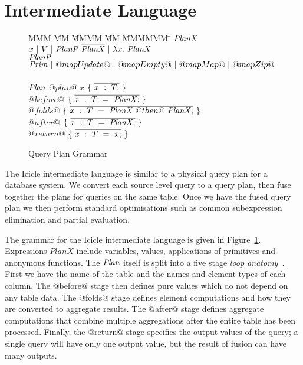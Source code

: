 \section{Intermediate Language}
\label{s:IcicleCore}

\begin{figure}

\begin{tabbing}
MMM \= MM \= MMMM \= MM \= MMMMMM \= \kill
$\mathit{PlanX}$
\GrammarDef
  $x~|~V~|~\mathit{PlanP}~\overline{\mathit{PlanX}}~|~\lambda{}x.~\mathit{PlanX}$
\\
$\mathit{PlanP}$
\GrammarDef
  $\mathit{Prim}~|~@mapUpdate@~|~@mapEmpty@~|~@mapMap@~|~@mapZip@$
\\
\\
$\mathit{Plan}$
\GrammarDef
  $@plan@~x$ \> $\{~\overline{x~:~T;}~\}$
\\
  \> \> $@before@$ \> $\{~\overline{x~:~T~=~\mathit{PlanX};}~\}$ \\
  \> \> $@folds@$  \> $\{~\overline{x~:~T~=~\mathit{PlanX}~@then@~\mathit{PlanX};}~\}$ \\
  \> \> $@after@$  \> $\{~\overline{x~:~T~=~\mathit{PlanX};}~\}$ \\
  \> \> $@return@$ \> $\{~\overline{x~:~T~=~x;}~\}$ \\
\end{tabbing}



\caption{Query Plan Grammar}
\label{fig:core:grammar}
\end{figure}

The Icicle intermediate language is similar to a physical query plan for a database system. We convert each source level query to a query plan, then fuse together the plans for queries on the same table. Once we have the fused query plan we then perform standard optimisations such as common subexpression elimination and partial evaluation.

The grammar for the Icicle intermediate language is given in Figure~\ref{fig:core:grammar}.
Expressions $PlanX$ include variables, values, applications of primitives and anonymous functions.
The $\mathit{Plan}$ itself is split into a five stage \emph{loop anatomy}~\cite{Shivers:Anatomy}. First we have the name of the table and the names and element types of each column. The @before@ stage then defines pure values which do not depend on any table data. The @folds@ stage defines element computations and how they are converted to aggregate results. The @after@ stage defines aggregate computations that combine multiple aggregations after the entire table has been processed. Finally, the @return@ stage specifies the output values of the query; a single query will have only one output value, but the result of fusion can have many outputs.

